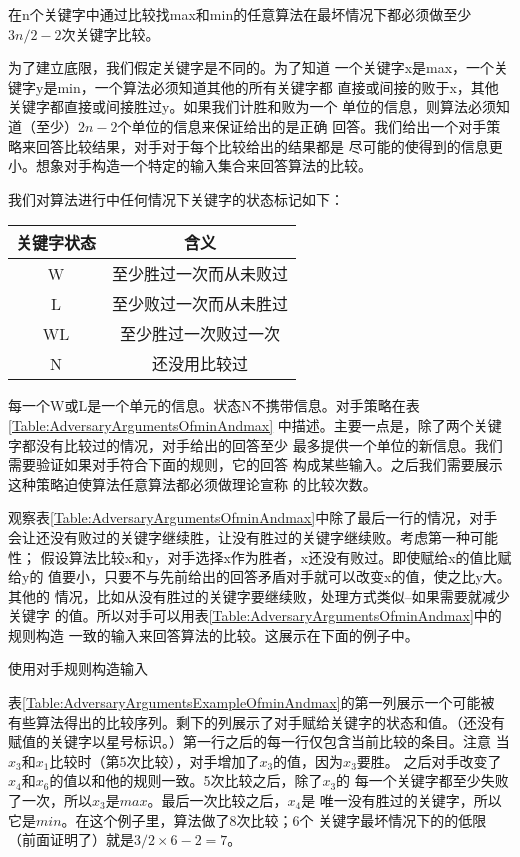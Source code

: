 \begin{theorem}\label{Theorem:5_1}
在n个关键字中通过比较找max和min的任意算法在最坏情况下都必须做至少
$3n/2-2$次关键字比较。

 为了建立底限，我们假定关键字是不同的。为了知道
一个关键字x是max，一个关键字y是min，一个算法必须知道其他的所有关键字都
直接或间接的败于x，其他关键字都直接或间接胜过y。如果我们计胜和败为一个
单位的信息，则算法必须知道（至少）$2n-2$个单位的信息来保证给出的是正确
回答。我们给出一个对手策略来回答比较结果，对手对于每个比较给出的结果都是
尽可能的使得到的信息更小。想象对手构造一个特定的输入集合来回答算法的比较。

我们对算法进行中任何情况下关键字的状态标记如下：
\begin{center}
\begin{tabular}{cc}
关键字状态 &含义\\
\hline
W   &至少胜过一次而从未败过\\
L   &至少败过一次而从未胜过\\
WL  &至少胜过一次败过一次\\
N   &还没用比较过\\
\end{tabular}
\end{center}

每一个W或L是一个单元的信息。状态N不携带信息。对手策略在表\ref{Table:AdversaryArgumentsOfminAndmax}
中描述。主要一点是，除了两个关键字都没有比较过的情况，对手给出的回答至少
最多提供一个单位的新信息。我们需要验证如果对手符合下面的规则，它的回答
构成某些输入。之后我们需要展示这种策略迫使算法任意算法都必须做理论宣称
的比较次数。

观察表\ref{Table:AdversaryArgumentsOfminAndmax}中除了最后一行的情况，对手
会让还没有败过的关键字继续胜，让没有胜过的关键字继续败。考虑第一种可能性；
假设算法比较x和y，对手选择x作为胜者，x还没有败过。即使赋给x的值比赋给y的
值要小，只要不与先前给出的回答矛盾对手就可以改变x的值，使之比y大。其他的
情况，比如从没有胜过的关键字要继续败，处理方式类似--如果需要就减少关键字
的值。所以对手可以用表\ref{Table:AdversaryArgumentsOfminAndmax}中的规则构造
一致的输入来回答算法的比较。这展示在下面的例子中。
\end{theorem}

\begin{example}
使用对手规则构造输入

表\ref{Table:AdversaryArgumentsExampleOfminAndmax}的第一列展示一个可能被
有些算法得出的比较序列。剩下的列展示了对手赋给关键字的状态和值。（还没有
赋值的关键字以星号标识。）第一行之后的每一行仅包含当前比较的条目。注意
当$x_3$和$x_1$比较时（第5次比较），对手增加了$x_3$的值，因为$x_3$要胜。
之后对手改变了$x_4$和$x_6$的值以和他的规则一致。5次比较之后，除了$x_3$的
每一个关键字都至少失败了一次，所以$x_3$是$max$。最后一次比较之后，$x_4$是
唯一没有胜过的关键字，所以它是$min$。在这个例子里，算法做了8次比较；6个
关键字最坏情况下的的低限（前面证明了）就是$3/2 \times 6-2=7$。

\end{example}

